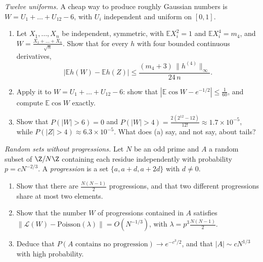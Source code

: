 \begin{exercise}[$\star\star$]\label{pb:twelve}
\emph{Twelve uniforms.} A cheap way to produce roughly Gaussian numbers is $W=U_1+\dots+U_{12}-6$, with $U_i$ independent and uniform on $[0,1]$.
\begin{enumerate}[label=(\alph*)]
\item Let $X_1,\dots,X_n$ be independent, symmetric, with $\mathbb EX_i^2=1$ and $\mathbb EX_i^4=m_4$, and $W=\frac{X_1+\dots+X_n}{\sqrt n}$. Show that for every $h$ with four
bounded continuous derivatives,
\[
\bigl|\mathbb Eh(W)-\mathbb Eh(Z)\bigr|\le\frac{(m_4+3)\,\|h^{(4)}\|_\infty}{24\,n}.
\]
\item Apply it to $W=U_1+\dots+U_{12}-6$: show that $|\mathbb E\cos W-e^{-1/2}|\le\frac1{60}$, and compute $\mathbb E\cos W$ exactly.
\item Show that $P(|W|>6)=0$ and $P(|W|>4)=\frac{2(2^{12}-12)}{12!}\approx1.7\times10^{-5}$, while $P(|Z|>4)\approx6.3\times10^{-5}$. What does (a) say, and not say, about tails?
\end{enumerate}
\end{exercise}

\begin{exercise}[$\star\star$]\label{pb:threeap}
\emph{Random sets without progressions.} Let $N$ be an odd prime and $A$ a random subset of $\Z/N\Z$ containing each residue independently with probability
$p=cN^{-2/3}$. A \emph{progression} is a set $\{a,a+d,a+2d\}$ with $d\ne0$.
\begin{enumerate}[label=(\alph*)]
\item Show that there are $\frac{N(N-1)}2$ progressions, and that two different progressions share at most two elements.
\item Show that the number $W$ of progressions contained in $A$ satisfies $\|\mathcal L(W)-\text{Poisson}(\lambda)\|=O(N^{-1/3})$, with $\lambda=p^3\frac{N(N-1)}2$.
\item Deduce that $P(A\text{ contains no progression})\to e^{-c^3/2}$, and that $|A|\sim cN^{1/3}$ with high probability.
\end{enumerate}
\end{exercise}

